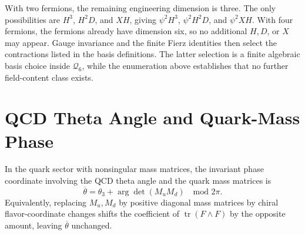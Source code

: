 With two fermions, the remaining engineering dimension is three.  The only
possibilities are \(H^3\), \(H^2D\), and \(XH\), giving
\(\psi^2H^3\), \(\psi^2H^2D\), and \(\psi^2XH\).  With four fermions, the
fermions already have dimension six, so no additional \(H,D\), or \(X\) may
appear.  Gauge invariance and the finite Fierz identities then select the
contractions listed in the basis definitions.  The latter selection is a finite
algebraic basis choice inside \(\mathcal Q_6\), while the enumeration above
establishes that no further field-content class exists.

\section{QCD Theta Angle and Quark-Mass Phase}

\begin{proposition}
\label{prop:sm-strong-cp-phase}
In the quark sector with nonsingular mass matrices, the invariant phase
coordinate involving the QCD theta angle and the quark mass matrices is
\begin{equation}
  \overline\theta
  =
  \theta_3+\arg\det(M_uM_d)
  \quad\text{mod }2\pi .
  \label{eq:sm-strong-cp-phase}
\end{equation}
Equivalently, replacing \(M_u,M_d\) by positive diagonal mass matrices by
chiral flavor-coordinate changes shifts the coefficient of
\(\operatorname{tr}(F\wedge F)\) by the opposite amount, leaving
\(\overline\theta\) unchanged.
\end{proposition}

